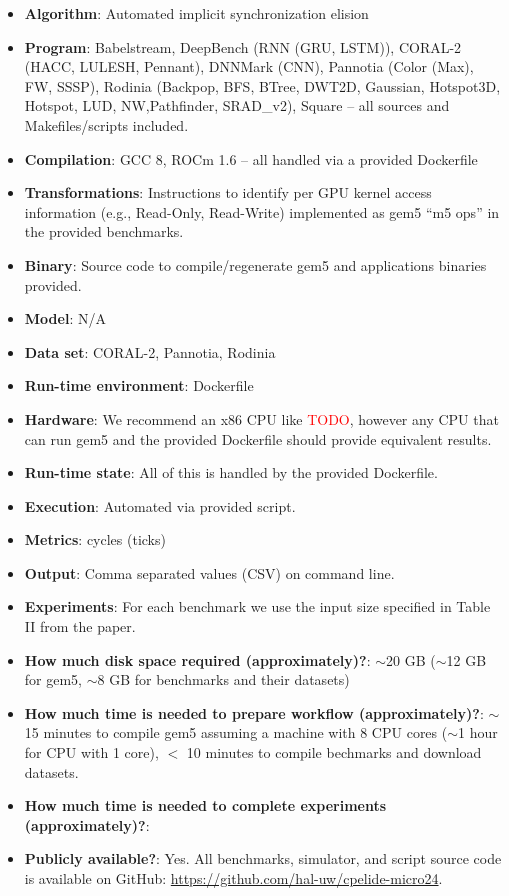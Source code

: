 \documentclass{sigplanconf}
\begin{document}
{\small
\begin{itemize}
  \item {\bf Algorithm}: Automated implicit synchronization elision
  \item {\bf Program}: Babelstream, DeepBench (RNN (GRU, LSTM)), CORAL-2 (HACC, LULESH, Pennant), DNNMark (CNN), Pannotia (Color (Max), FW, SSSP), Rodinia (Backpop, BFS, BTree, DWT2D, Gaussian, Hotspot3D, Hotspot, LUD, NW,Pathfinder, SRAD\_v2), Square -- all sources and Makefiles/scripts included.
  \item {\bf Compilation}: GCC 8, ROCm 1.6 -- all handled via a provided Dockerfile
  \item {\bf Transformations}: Instructions to identify per GPU kernel access information (e.g., Read-Only, Read-Write) implemented as gem5 ``m5 ops'' in the provided benchmarks.
  \item {\bf Binary}: Source code to compile/regenerate gem5 and applications binaries provided.
  \item {\bf Model}: N/A
  \item {\bf Data set}: CORAL-2, Pannotia, Rodinia
  \item {\bf Run-time environment}: Dockerfile
  \item {\bf Hardware}: We recommend an x86 CPU like \textcolor{red}{TODO}, however any CPU that can run gem5 and the provided Dockerfile should provide equivalent results.
  \item {\bf Run-time state}: All of this is handled by the provided Dockerfile.
  \item {\bf Execution}: Automated via provided script.
  \item {\bf Metrics}: cycles (ticks)
  \item {\bf Output}: Comma separated values (CSV) on command line.
  \item {\bf Experiments}: For each benchmark we use the input size specified in Table II from the paper.
  \item {\bf How much disk space required (approximately)?}: $\sim$20 GB ($\sim$12 GB for gem5, $\sim$8 GB for benchmarks and their datasets)
  \item {\bf How much time is needed to prepare workflow (approximately)?}: $\sim$15 minutes to compile gem5 assuming a machine with 8 CPU cores ($\sim$1 hour for CPU with 1 core), $<$ 10 minutes to compile bechmarks and download datasets.
  \item {\bf How much time is needed to complete experiments (approximately)?}: 
  \item {\bf Publicly available?}: Yes.  All benchmarks, simulator, and script source code is available on GitHub: \url{https://github.com/hal-uw/cpelide-micro24}.

\end{itemize}}
\end{document}
